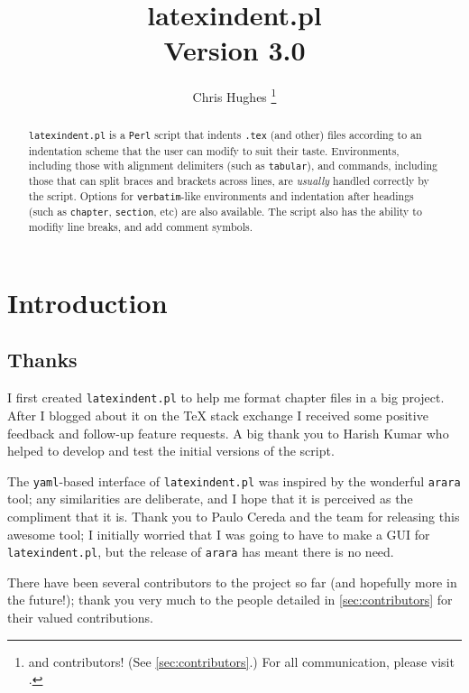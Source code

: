 \documentclass[10pt]{article}
\begin{document}
\title{\ttfamily\bfseries latexindent.pl\\[1cm] Version 3.0}
\author{Chris Hughes \footnote{and contributors! (See \vref{sec:contributors}.) For
		all communication, please visit \cite{latexindent-home}.}}
\maketitle
\begin{abstract}
	\texttt{latexindent.pl} is a \texttt{Perl} script that indents \texttt{.tex} (and other)
	files according to an indentation scheme that the user can modify to suit their
	taste. Environments, including those with alignment delimiters (such as \texttt{tabular}),
	and commands, including those that can split braces and brackets across lines,
	are \emph{usually} handled correctly by the script. Options for \texttt{verbatim}-like
	environments and indentation after headings (such as \lstinline!chapter!, \lstinline!section!, etc)
	are also available. The script also has the ability to modifiy line breaks, and add
	comment symbols.
\end{abstract}
\tableofcontents
\lstlistoflistings

\section{Introduction}
\subsection{Thanks}
I first created \texttt{latexindent.pl} to help me format chapter files
in a big project. After I blogged about it on the
\TeX{} stack exchange \cite{cmhblog} I received some positive feedback and
follow-up feature requests. A big thank you to Harish Kumar who
helped to develop and test the initial versions of the script.

The \texttt{yaml}-based interface of \texttt{latexindent.pl} was inspired
by the wonderful \texttt{arara} tool; any similarities are deliberate, and
I hope that it is perceived as the compliment that it is. Thank you to Paulo Cereda and the
team for releasing this awesome tool; I initially worried that I was going to
have to make a GUI for \texttt{latexindent.pl}, but the release of \texttt{arara}
has meant there is no need.

There have been several contributors to the project so far (and hopefully more in
the future!); thank you very much to the people detailed in \vref{sec:contributors}
for their valued contributions.
\end{document}
